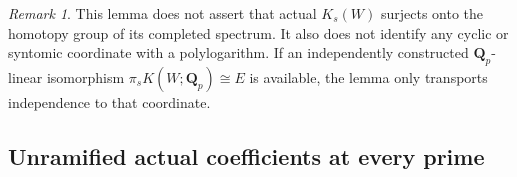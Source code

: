 \documentclass[11pt,a4paper]{article}
\theoremstyle{remark}
\newtheorem{remark}[theorem]{Remark}
\newcommand{\Q}{\mathbf Q}
\begin{document}
\begin{remark}
This lemma does not assert that actual $K_s(W)$ surjects onto the
homotopy group of its completed spectrum. It also does not identify
any cyclic or syntomic coordinate with a polylogarithm. If an
independently constructed $\Q_p$-linear isomorphism
$\pi_sK(W;\Q_p)\cong E$ is available, the lemma only transports
independence to that coordinate.
\end{remark}


\subsection{Unramified actual coefficients at every prime}
\label{sec:unramifiedhighercoefficients}
\end{document}
